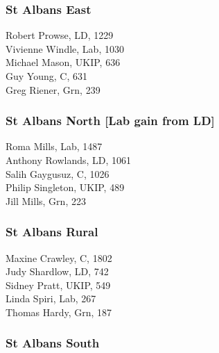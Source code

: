 \documentclass[a4paper,openany,10pt]{book}
\begin{document}
\subsubsection*{St Albans East}



Robert Prowse, LD, 1229\\
Vivienne Windle, Lab, 1030\\
Michael Mason, UKIP, 636\\
Guy Young, C, 631\\
Greg Riener, Grn, 239\\


\subsubsection*{St Albans North \hspace*{\fill}\nolinebreak[1]%
\enspace\hspace*{\fill}
[Lab gain from LD]}



Roma Mills, Lab, 1487\\
Anthony Rowlands, LD, 1061\\
Salih Gaygusuz, C, 1026\\
Philip Singleton, UKIP, 489\\
Jill Mills, Grn, 223\\


\subsubsection*{St Albans Rural}



Maxine Crawley, C, 1802\\
Judy Shardlow, LD, 742\\
Sidney Pratt, UKIP, 549\\
Linda Spiri, Lab, 267\\
Thomas Hardy, Grn, 187\\


\subsubsection*{St Albans South}

\end{document}
